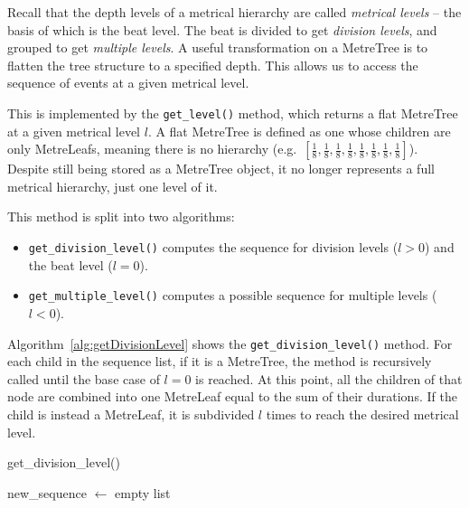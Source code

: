\documentclass[12pt,twoside,openright]{report}
\begin{document}
Recall that the depth levels of a metrical hierarchy are called \emph{metrical levels} -- the basis of which is the beat level. The beat is divided to get \emph{division levels}, and grouped to get \emph{multiple levels}. A useful transformation on a MetreTree is to flatten the tree structure to a specified depth. This allows us to access the sequence of events at a given metrical level.

This is implemented by the \verb'get_level()' method, which returns a flat MetreTree at
a given metrical level $l$. A flat MetreTree is defined as one whose children are
only MetreLeafs, meaning there is no hierarchy (e.g.\ $\left[\frac{1}{8},\frac{1}{8},\frac{1}{8},\frac{1}{8},\frac{1}{8},\frac{1}{8},\frac{1}{8},\frac{1}{8}\right]$). Despite still being stored as a MetreTree object, it no longer represents a full metrical hierarchy, just one level of it.

This method is split into two algorithms:
\begin{itemize}
    \item \verb'get_division_level()' computes the sequence for division levels ($l>0$) and the beat level ($l=0$).
	\item \verb'get_multiple_level()' computes a possible sequence for multiple levels ($l<0$).
\end{itemize}

Algorithm~\ref{alg:getDivisionLevel} shows the \verb'get_division_level()' method. For each child in the
sequence list, if it is a MetreTree, the method is recursively called until the
base case of $l=0$ is reached. At this point, all the children of that node are
combined into one MetreLeaf equal to the sum of their durations. If the child is
instead a MetreLeaf, it is subdivided $l$ times to reach the desired metrical
level.

\begin{algorithm}[H]

    \caption{get\_division\_level()}
    \BlankLine

    new\_sequence $\gets$ empty list\;
    \label{alg:getDivisionLevel}
\end{algorithm}
\end{document}
